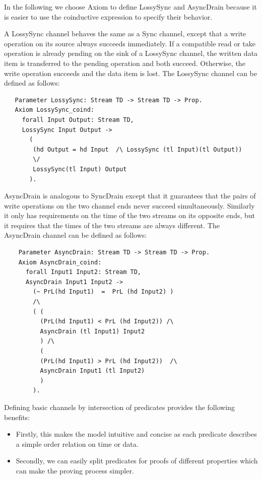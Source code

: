 \documentclass[3p,times]{elsarticle}
\begin{document}
In the following we choose Axiom to define LossySync and AsyncDrain
because it is easier to use the coinductive expression to specify
their behavior.

A LossySync channel behaves the same as a Sync channel, except that a write operation on its source always succeeds immediately. If a compatible read or take operation is already pending on the sink of a LossySync channel, the written data item is transferred to the pending operation and both succeed. Otherwise, the write operation succeeds and the data item is lost. The LossySync channel can be defined as follows:
\begin{verbatim}
   Parameter LossySync: Stream TD -> Stream TD -> Prop.
   Axiom LossySync_coind:
     forall Input Output: Stream TD,
     LossySync Input Output ->
       (
        (hd Output = hd Input  /\ LossySync (tl Input)(tl Output))
        \/
        LossySync(tl Input) Output
       ).
\end{verbatim}

AsyncDrain is analogous to SyncDrain except that it guarantees that the pairs of write operations on the two channel ends never succeed simultaneously. Similarly it only has requirements on the time of the two streams on its opposite ends, but it requires that the times of the two streams are always different. The AsyncDrain channel can be defined as follows:
\begin{verbatim}
    Parameter AsyncDrain: Stream TD -> Stream TD -> Prop.
    Axiom AsyncDrain_coind:
      forall Input1 Input2: Stream TD,
      AsyncDrain Input1 Input2 ->
        (~ PrL(hd Input1)  =  PrL (hd Input2) )
        /\
        ( (
          (PrL(hd Input1) < PrL (hd Input2)) /\
          AsyncDrain (tl Input1) Input2
          ) /\
          (
          (PrL(hd Input1) > PrL (hd Input2))  /\
          AsyncDrain Input1 (tl Input2)
          )
        ).
\end{verbatim}

Defining basic channels by intersection of predicates provides the following benefits:
\begin{itemize}
\item Firstly, this makes the model intuitive and concise as each predicate describes a simple order relation on time or data.
\item Secondly, we can easily split predicates for proofs of different properties which can make the proving process simpler.
\end{itemize}
\end{document}
